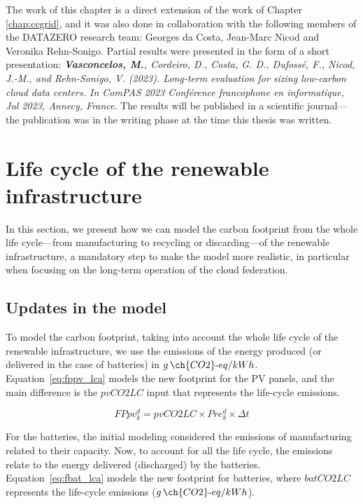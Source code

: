 The work of this chapter is a direct extension of the work of Chapter \ref{chap:ccgrid}, and it was also done in collaboration with the following members of the DATAZERO\cite{datazero} research team: Georges da Costa, Jean-Marc Nicod and Veronika Rehn-Sonigo. Partial results were presented in the form of a short presentation:   \textit{\textbf{Vasconcelos, M.}, Cordeiro, D., Costa, G. D., Dufossé, F., Nicod, J.-M., and Rehn-Sonigo, V. (2023). Long-term evaluation for sizing low-carbon cloud data centers. In ComPAS 2023 Conférence francophone en informatique, Jul 2023, Annecy, France}. The results will be published in a scientific journal---the publication was in the writing phase at the time this thesis was written. 




\section{Life cycle of the renewable infrastructure}
\label{sec:lifecicle}

In this section, we present how we can model the carbon footprint from the whole life cycle---from manufacturing to recycling or discarding---of the renewable infrastructure,  a mandatory step to make the model more realistic, in particular when focusing on the long-term operation of the cloud federation.


\subsection{Updates in the model}



To model the carbon footprint, taking into account the whole life cycle of the renewable infrastructure,  we use the emissions of the energy produced (or delivered in the case of batteries) in $g\,\ch{CO2}\text{-}eq/kWh$. Equation~\eqref{eq:fppv_lca} models the new footprint for the PV panels, and the main difference is the $pvCO2LC$ input that represents the life-cycle emissions.

\begin{equation} \label{eq:fppv_lca}
   FPpv^d_k =  pvCO2LC \times Pre_k^d \times \Delta t
\end{equation}

For the batteries, the initial modeling considered the emissions of manufacturing related to their capacity. Now, to account for all the life cycle, the emissions relate to the energy delivered (discharged) by the batteries. Equation~\eqref{eq:fbat_lca} models the new footprint for batteries, where $batCO2LC$ represents the life-cycle emissions  ($g\,\ch{CO2}\text{-}eq/kWh$).

